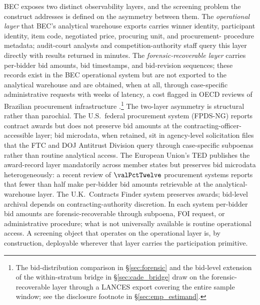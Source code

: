 BEC exposes two distinct observability layers, and the screening
problem the construct addresses is defined on the asymmetry
between them. The \emph{operational layer} that BEC's analytical
warehouse exports carries winner identity, participant identity,
item code, negotiated price, procuring unit, and procurement-
procedure metadata; audit-court analysts and competition-authority
staff query this layer directly with results returned in
minutes. The \emph{forensic-recoverable layer} carries
per-bidder bid amounts, bid timestamps, and bid-revision
sequences; these records exist in the BEC operational system but
are not exported to the analytical warehouse and are obtained,
when at all, through case-specific administrative requests with
weeks of latency, a cost flagged in OECD reviews of Brazilian
procurement infrastructure
\citep{oecd2019government}.\footnote{The bid-distribution
comparison in \S\ref{sec:forensic} and the bid-level extension
of the within-stratum bridge in \S\ref{sec:cade_bridge} draw on
the forensic-recoverable layer through a LANCES export covering
the entire sample window; see the disclosure footnote in
\S\ref{sec:emp_estimand}.}
The two-layer asymmetry is structural rather than parochial. The
U.S.\ federal procurement system (FPDS-NG) reports contract
awards but does not preserve bid amounts at the
contracting-officer-accessible layer; bid microdata, when
retained, sit in agency-level solicitation files that the FTC
and DOJ Antitrust Division query through case-specific subpoenas
rather than routine analytical access. The European Union's TED
publishes the award-record layer mandatorily across member states
but preserves bid microdata heterogeneously: a recent review of
$\valPctTwelve$ procurement systems
\citep{sanchezgraells2019screening} reports that fewer than half
make per-bidder bid amounts retrievable at the analytical-
warehouse layer. The U.K.\ Contracts Finder system preserves
awards; bid-level archival depends on contracting-authority
discretion. In each system per-bidder bid amounts are
forensic-recoverable through subpoena, FOI request, or
administrative procedure; what is not universally available is
routine operational access. A screening object that operates on
the operational layer is, by construction, deployable wherever
that layer carries the participation primitive.

